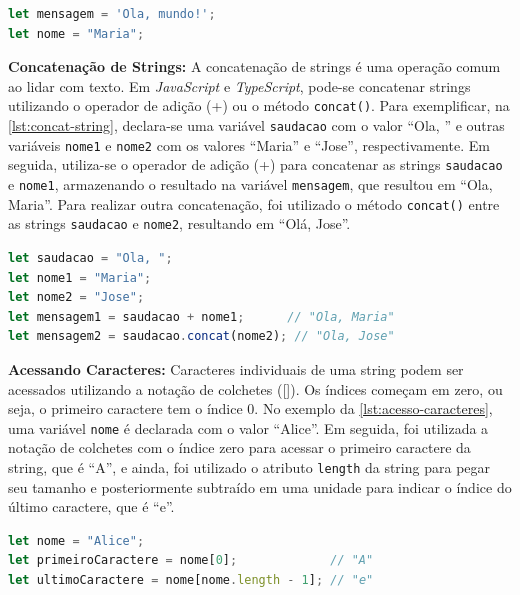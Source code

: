 \begin{lstlisting}[language=TypeScript, label=lst:dec-string, caption=Declaração de String em JS e TS.]
let mensagem = 'Ola, mundo!';
let nome = "Maria";
\end{lstlisting}


\textbf{Concatenação de Strings:} A concatenação de strings é uma operação comum ao lidar com texto. Em \textit{JavaScript} e \textit{TypeScript}, pode-se concatenar strings utilizando o operador de adição (+) ou o método \texttt{concat()}. Para exemplificar, na \autoref{lst:concat-string}, declara-se uma variável \texttt{saudacao} com o valor ``Ola, '' e outras variáveis \texttt{nome1} e \texttt{nome2} com os valores ``Maria'' e ``Jose'', respectivamente. Em seguida, utiliza-se o operador de adição (+) para concatenar as strings \texttt{saudacao} e \texttt{nome1}, armazenando o resultado na variável \texttt{mensagem}, que resultou em ``Ola, Maria''. Para realizar outra concatenação, foi utilizado o método \texttt{concat()} entre as strings \texttt{saudacao} e \texttt{nome2}, resultando em ``Olá, Jose''.

\begin{lstlisting}[language=TypeScript, label=lst:concat-string, caption=Concatenção de String em JS e TS.]
let saudacao = "Ola, ";
let nome1 = "Maria";
let nome2 = "Jose";
let mensagem1 = saudacao + nome1;      // "Ola, Maria"
let mensagem2 = saudacao.concat(nome2); // "Ola, Jose"
\end{lstlisting}

\textbf{Acessando Caracteres:} Caracteres individuais de uma string podem ser acessados utilizando a notação de colchetes ([]). Os índices começam em zero, ou seja, o primeiro caractere tem o índice 0. No exemplo da \autoref{lst:acesso-caracteres}, uma variável \texttt{nome} é declarada com o valor ``Alice''. Em seguida, foi utilizada a notação de colchetes com o índice zero para acessar o primeiro caractere da string, que é ``A'', e ainda, foi utilizado o atributo \texttt{length} da string para pegar seu tamanho e posteriormente subtraído em uma unidade para indicar o índice do último caractere, que é ``e''.

\begin{lstlisting}[language=TypeScript, caption= Acessando caracteres de strings em JS e TS., label=lst:acesso-caracteres]
let nome = "Alice";
let primeiroCaractere = nome[0];             // "A"
let ultimoCaractere = nome[nome.length - 1]; // "e"
\end{lstlisting}

